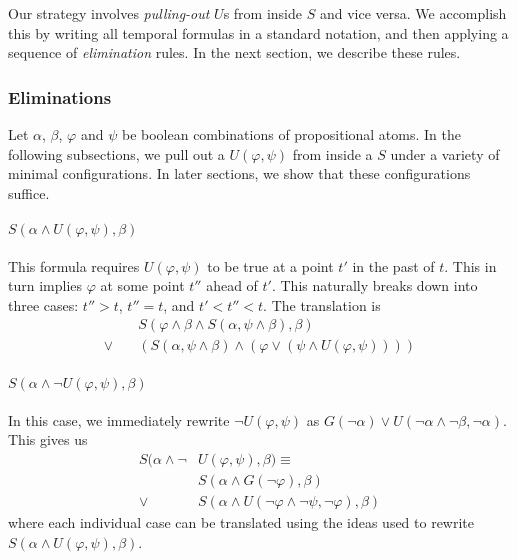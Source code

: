 \documentclass[a4paper,UKenglish,cleveref, autoref, thm-restate, numberwithinsect]{lipics-v2021}
\begin{document}
Our strategy involves \textit{pulling-out} $U$s from inside $S$ and vice versa. We accomplish this by writing all temporal formulas in a standard notation, and then applying a sequence of \textit{elimination} rules. In the next section, we describe these rules.

\subsubsection{Eliminations}
\label{sec:eliminations-linear}

Let $\alpha$, $\beta$, $\varphi$ and $\psi$ be boolean combinations of propositional atoms. In the following subsections, we pull out a $U(\varphi, \psi)$ from inside a $S$ under a variety of minimal configurations. In later sections, we show that these configurations suffice.

\paragraph*{$S(\alpha \land U(\varphi, \psi), \beta)$}
This formula requires $U(\varphi, \psi)$ to be true at a point $t'$ in the past of $t$. This in turn implies $\varphi$ at some point $t''$ ahead of $t'$. This naturally breaks down into three cases: $t'' > t$, $t'' = t$, and $t' < t'' < t$. The translation is
\begin{equation*}
    \begin{aligned}
        &S(\varphi \land \beta \land S(\alpha, \psi \land \beta), \beta)\\
        \lor \quad &\left(S(\alpha, \psi \land \beta) \land \left(\varphi \lor \left(\psi \land U(\varphi, \psi) \right) \right) \right)
    \end{aligned}
\end{equation*}

\paragraph*{$S(\alpha \land \lnot U(\varphi, \psi), \beta)$}
In this case, we immediately rewrite $\lnot U(\varphi, \psi)$ as $G(\lnot \alpha) \lor U(\lnot \alpha \land \lnot \beta, \lnot \alpha)$. This gives us
\begin{equation*}
    \begin{aligned}
        S(\alpha \land \lnot &U(\varphi, \psi), \beta) \equiv\\
        &S(\alpha \land G(\lnot \varphi), \beta) \\
        \lor \quad &S(\alpha \land U(\lnot \varphi \land \lnot \psi, \lnot \varphi), \beta)
    \end{aligned}
\end{equation*}
where each individual case can be translated using the ideas used to rewrite $S(\alpha \land U(\varphi, \psi), \beta)$.
\end{document}
